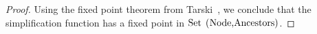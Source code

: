 \begin{proof}
	Using the fixed point theorem from Tarski~\cite{tarski1955lattice}, 
	we conclude that the simplification function has a
	fixed point in $\text{\lstinline{Set (Node,Ancestors)}}$.
%	
\end{proof}

